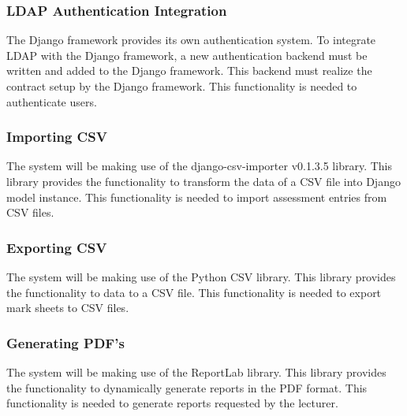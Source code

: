 \subsubsection{LDAP Authentication Integration}

The Django framework provides its own authentication system. To integrate LDAP with the Django framework, 
a new authentication backend must be written and added to the Django framework. This backend must realize the
contract setup by the Django framework. This functionality is needed to authenticate users.

\subsubsection{Importing CSV}

The system will be making use of the django-csv-importer v0.1.3.5 library. This library provides the functionality to transform the data of a CSV file into Django model instance. This functionality is needed to import assessment entries from CSV files.

\subsubsection{Exporting CSV}

The system will be making use of the Python CSV library. This library provides the functionality to data to a CSV file. This functionality is needed to export mark sheets to CSV files.

\subsubsection{Generating PDF's}

The system will be making use of the ReportLab library. This library provides the functionality to dynamically generate reports in the PDF format. This functionality is needed to generate reports requested by the lecturer.